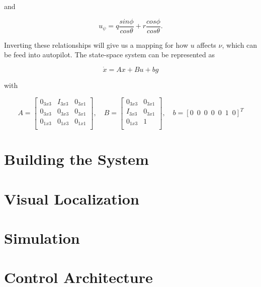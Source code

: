 \documentclass[dvips,12pt]{article}
\begin{document}
\noindent and

\begin{equation}
u_{\psi} =
q\frac{sin\phi}{cos\theta} + r\frac{cos\phi}{cos\theta}.
\end{equation}

\noindent Inverting these relationships will give us a mapping for how $u$ affects $\nu$, which can be feed into autopilot. The state-space system can be represented as

\begin{equation}
\dot{x} = Ax + Bu + bg
\end{equation}

\noindent with


\begin{equation}
A =
\begin{bmatrix}
0_{3x3} & I_{3x3} & 0_{3x1} \\
0_{3x3} & 0_{3x3} & 0_{3x1} \\
0_{1x3} & 0_{1x3} & 0_{1x1} \\
\end{bmatrix}
, \quad
B =
\begin{bmatrix}
0_{3x3} & 0_{3x1} \\
I_{3x3} & 0_{3x1} \\
0_{1x3} & 1 \\
\end{bmatrix}
, \quad
b = [0 \enspace 0 \enspace 0 \enspace 0 \enspace 0 \enspace 1 \enspace 0]^T
\end{equation}


\section{Building the System}

\section{Visual Localization}

\section{Simulation}

\section{Control Architecture}
\end{document}
